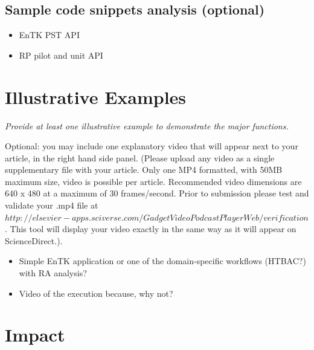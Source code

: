 \documentclass[preprint,12pt, a4paper]{elsarticle}
\begin{document}
\subsection{Sample code snippets analysis (optional)}\label{ssec:code}

\begin{itemize}
  \item EnTK PST API
  \item RP pilot and unit API
\end{itemize}

\section{Illustrative Examples}\label{sec:examples}

{\em Provide at least one illustrative example to demonstrate the major
functions.

Optional: you may include one explanatory video that will appear next to your
article, in the right hand side panel. (Please upload any video as a single
supplementary file with your article. Only one MP4 formatted, with 50MB
maximum size, video is possible per article. Recommended video dimensions are
640 x 480 at a maximum of 30 frames/second. Prior to submission please test
and validate your .mp4 file at $
http://elsevier-apps.sciverse.com/GadgetVideoPodcastPlayerWeb/verification$.
This tool will display your video exactly in the same way as it will appear
on ScienceDirect.).}

\begin{itemize}
  \item Simple EnTK application or one of the domain-specific workflows
  (HTBAC?) with RA analysis?
  \item Video of the execution because, why not?
\end{itemize}


\section{Impact}\label{sec:impact}
\end{document}
